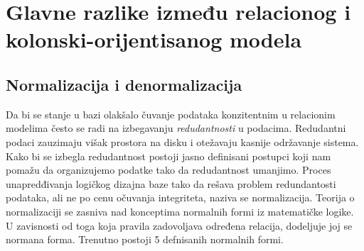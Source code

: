 \documentclass[12pt,oneside]{memoir}
\begin{document}
\pagebreak

\section{Glavne razlike između relacionog i kolonski-orijentisanog modela}


\subsection{Normalizacija i denormalizacija}

Da bi se stanje u bazi olakšalo čuvanje podataka konzitentnim u relacionim modelima često se radi na izbegavanju \textit{redudantnosti} u podacima. Redudantni podaci zauzimaju višak prostora na disku i otežavaju kasnije održavanje sistema. Kako bi se izbegla redudantnost postoji jasno definisani postupci koji nam pomažu da organizujemo podatke tako da redudantnost umanjimo. Proces unapredđivanja logičkog dizajna baze tako da rešava problem redundantosti podataka, ali ne po cenu očuvanja integriteta, naziva se normalizacija. Teorija o normalizaciji se zasniva nad konceptima normalnih formi iz matematičke logike. U zavisnosti od toga koja pravila zadovoljava određena relacija, dodeljuje joj se normana forma. Trenutno postoji 5 defnisanih normalnih formi. 
\end{document}
